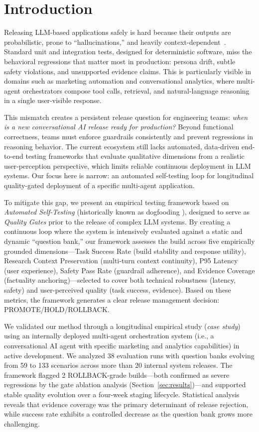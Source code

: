 \section{Introduction}
\label{sec:introduction}

Releasing LLM-based applications safely is hard because their outputs are probabilistic, prone to ``hallucinations,'' and heavily context-dependent~\cite{dobslaw2025testing}. Standard unit and integration tests, designed for deterministic software, miss the behavioral regressions that matter most in production: persona drift, subtle safety violations, and unsupported evidence claims. This is particularly visible in domains such as marketing automation and conversational analytics, where multi-agent orchestrators compose tool calls, retrieval, and natural-language reasoning in a single user-visible response.

This mismatch creates a persistent release question for engineering teams: \textit{when is a new conversational AI release ready for production?} Beyond functional correctness, teams must enforce guardrails consistently and prevent regressions in reasoning behavior. The current ecosystem still lacks automated, data-driven end-to-end testing frameworks that evaluate qualitative dimensions from a realistic user-perception perspective, which limits reliable continuous deployment in LLM systems. Our focus here is narrow: an automated self-testing loop for longitudinal quality-gated deployment of a specific multi-agent application.

To mitigate this gap, we present an empirical testing framework based on \textit{Automated Self-Testing} (historically known as dogfooding \cite{harrison2006dogfooding}), designed to serve as \textit{Quality Gates} prior to the release of complex LLM systems. By creating a continuous loop where the system is intensively evaluated against a static and dynamic ``question bank,'' our framework assesses the build across five empirically grounded dimensions---Task Success Rate (build stability and response utility), Research Context Preservation (multi-turn context continuity), P95 Latency (user experience), Safety Pass Rate (guardrail adherence), and Evidence Coverage (factuality anchoring)---selected to cover both technical robustness (latency, safety) and user-perceived quality (task success, evidence). Based on these metrics, the framework generates a clear release management decision: PROMOTE/HOLD/ROLLBACK.

We validated our method through a longitudinal empirical study (\textit{case study}) using an internally deployed multi-agent orchestration system (i.e., a conversational AI agent with specific marketing and analytics capabilities) in active development. We analyzed 38 evaluation runs with question banks evolving from 59 to 133 scenarios across more than 20 internal system releases. The framework flagged 2 ROLLBACK-grade builds---both confirmed as severe regressions by the gate ablation analysis (Section~\ref{sec:results})---and supported stable quality evolution over a four-week staging lifecycle. Statistical analysis reveals that evidence coverage was the primary determinant of release rejection, while success rate exhibits a controlled decrease as the question bank grows more challenging.

